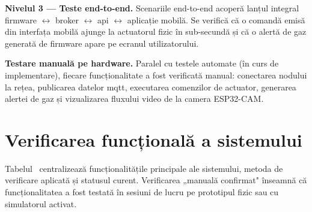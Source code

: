 \textbf{Nivelul 3 — Teste end-to-end.}
Scenariile end-to-end acoperă lanțul integral firmware $\leftrightarrow$ broker $\leftrightarrow$
\gls{api} $\leftrightarrow$ aplicație mobilă. Se verifică că o comandă emisă din interfața mobilă
ajunge la actuatorul fizic în sub-secundă și că o alertă de gaz generată de firmware apare pe
ecranul utilizatorului.

\textbf{Testare manuală pe hardware.}
Paralel cu testele automate (în curs de implementare), fiecare funcționalitate a fost verificată
manual: conectarea nodului la rețea, publicarea datelor \gls{mqtt}, executarea comenzilor de
actuator, generarea alertei de gaz și vizualizarea fluxului video de la camera ESP32-CAM.

\section{Verificarea funcțională a sistemului}
\label{sec:verificare-functionala}

Tabelul~ centralizează funcționalitățile principale ale sistemului,
metoda de verificare aplicată și statusul curent. Verificarea „manuală confirmat" înseamnă că
funcționalitatea a fost testată în sesiuni de lucru pe prototipul fizic sau cu simulatorul activat.

